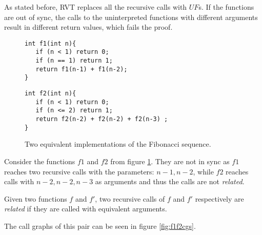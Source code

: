 As stated before, RVT replaces all the recursive calls with $UF$s. If the functions are out of sync, the calls to the uninterpreted functions with different arguments result in different return values, which fails the proof.
\begin{figure}[h]
\begin{center}
\begin{minipage}{7 cm}
\begin{lstlisting}
int f1(int n){
   if (n < 1) return 0;
   if (n == 1) return 1; 
   return f1(n-1) + f1(n-2);
}
\end{lstlisting}
\end{minipage}
\begin{minipage}{7 cm}
\begin{lstlisting}
int f2(int n){
   if (n < 1) return 0;
   if (n <= 2) return 1;
   return f2(n-2) + f2(n-2) + f2(n-3) ;
}
\end{lstlisting}
\end{minipage}
\caption{Two equivalent implementations of the Fibonacci sequence.}
\label{fig:f1f2}
\end{center}
\end{figure}
Consider the functions $f1$ and $f2$ from figure \ref{fig:f1f2}.
They are not in sync as $f1$ reaches two recursive calls with the parameters: $n-1,n-2$, while $f2$ reaches calls with $n-2,n-2,n-3$ as arguments and thus the calls are not \emph{related}.
\begin{definition}
\label{def:relatedcalls}
Given two functions $f$ and $f'$, two recursive calls of $f$ and $f'$ respectively are \emph{related}  if they are called with equivalent arguments.  
\end{definition}
The call graphs of this pair can be seen in figure \ref{fig:f1f2cgs}.

